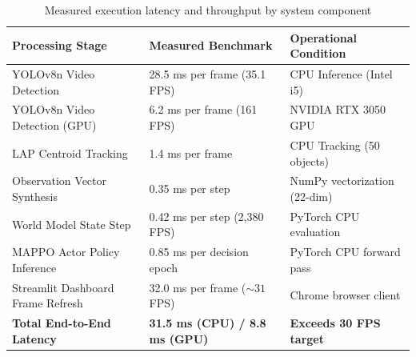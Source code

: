 \documentclass[12pt,a4paper,oneside]{report}
\begin{document}
\begin{table}[htbp]
\centering
\small
\caption{Measured execution latency and throughput by system component}
\label{tab:ch4_performance_metrics}
\begin{tabularx}{\textwidth}{|p{5.5cm}|p{4.5cm}|X|}
\hline
\textbf{Processing Stage} & \textbf{Measured Benchmark} & \textbf{Operational Condition} \\ \hline
YOLOv8n Video Detection & 28.5 ms per frame (35.1 FPS) & CPU Inference (Intel i5) \\ \hline
YOLOv8n Video Detection (GPU) & 6.2 ms per frame (161 FPS) & NVIDIA RTX 3050 GPU \\ \hline
LAP Centroid Tracking & 1.4 ms per frame & CPU Tracking (50 objects) \\ \hline
Observation Vector Synthesis & 0.35 ms per step & NumPy vectorization (22-dim) \\ \hline
World Model State Step & 0.42 ms per step (2,380 FPS) & PyTorch CPU evaluation \\ \hline
MAPPO Actor Policy Inference & 0.85 ms per decision epoch & PyTorch CPU forward pass \\ \hline
Streamlit Dashboard Frame Refresh & 32.0 ms per frame ($\sim 31$ FPS) & Chrome browser client \\ \hline
\textbf{Total End-to-End Latency} & \textbf{31.5 ms (CPU) / 8.8 ms (GPU)} & \textbf{Exceeds 30 FPS target} \\ \hline
\end{tabularx}
\end{table}
\end{document}
